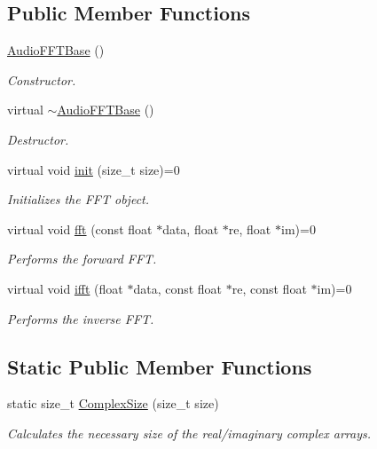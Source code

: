 \subsection*{Public Member Functions}
\begin{DoxyCompactItemize}
\item 
\mbox{\label{classaudiofft_1_1_audio_f_f_t_base_a19636644ba4d4d68e8cfb0f322c84529}} 
\hyperlink{classaudiofft_1_1_audio_f_f_t_base_a19636644ba4d4d68e8cfb0f322c84529}{Audio\+F\+F\+T\+Base} ()
\begin{DoxyCompactList}\small\item\em Constructor. \end{DoxyCompactList}\item 
\mbox{\label{classaudiofft_1_1_audio_f_f_t_base_a0706bdad2a32581b9e8ad3d9634e59f8}} 
virtual \hyperlink{classaudiofft_1_1_audio_f_f_t_base_a0706bdad2a32581b9e8ad3d9634e59f8}{$\sim$\+Audio\+F\+F\+T\+Base} ()
\begin{DoxyCompactList}\small\item\em Destructor. \end{DoxyCompactList}\item 
virtual void \hyperlink{classaudiofft_1_1_audio_f_f_t_base_a32447c362c9c78c570c5117762b190d4}{init} (size\+\_\+t size)=0
\begin{DoxyCompactList}\small\item\em Initializes the F\+FT object. \end{DoxyCompactList}\item 
virtual void \hyperlink{classaudiofft_1_1_audio_f_f_t_base_a6bc26fdcecf8fc098b56bdf6d0701ac5}{fft} (const float $\ast$data, float $\ast$re, float $\ast$im)=0
\begin{DoxyCompactList}\small\item\em Performs the forward F\+FT. \end{DoxyCompactList}\item 
virtual void \hyperlink{classaudiofft_1_1_audio_f_f_t_base_af633d8de53a76111f04de997e54d8f9f}{ifft} (float $\ast$data, const float $\ast$re, const float $\ast$im)=0
\begin{DoxyCompactList}\small\item\em Performs the inverse F\+FT. \end{DoxyCompactList}\end{DoxyCompactItemize}
\subsection*{Static Public Member Functions}
\begin{DoxyCompactItemize}
\item 
static size\+\_\+t \hyperlink{classaudiofft_1_1_audio_f_f_t_base_af0919d60c2bd7a05127625bfcc5c6a08}{Complex\+Size} (size\+\_\+t size)
\begin{DoxyCompactList}\small\item\em Calculates the necessary size of the real/imaginary complex arrays. \end{DoxyCompactList}\end{DoxyCompactItemize}



